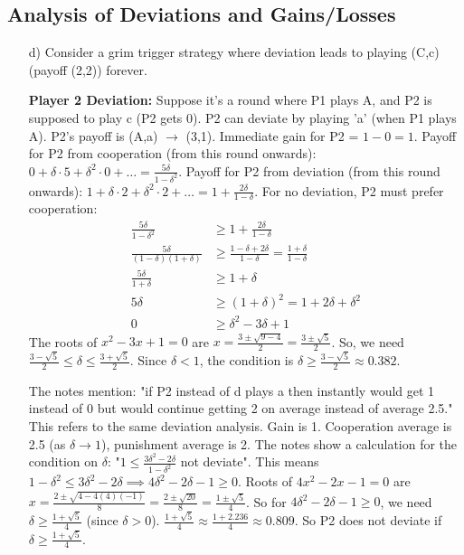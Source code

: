 \begin{solution}
\subsection*{Analysis of Deviations and Gains/Losses}
\begin{enumerate}
    \item[d)] Consider a grim trigger strategy where deviation leads to playing (C,c) (payoff (2,2)) forever.
    
    \textbf{Player 2 Deviation:}
    Suppose it's a round where P1 plays A, and P2 is supposed to play c (P2 gets 0).
    P2 can deviate by playing 'a' (when P1 plays A). P2's payoff is (A,a) $\rightarrow$ (3,1).
    Immediate gain for P2 = $1 - 0 = 1$.
    Payoff for P2 from cooperation (from this round onwards): $0 + \delta \cdot 5 + \delta^2 \cdot 0 + \dots = \frac{5\delta}{1-\delta^2}$.
    Payoff for P2 from deviation (from this round onwards): $1 + \delta \cdot 2 + \delta^2 \cdot 2 + \dots = 1 + \frac{2\delta}{1-\delta}$.
    For no deviation, P2 must prefer cooperation:
    \begin{align*} \frac{5\delta}{1-\delta^2} &\ge 1 + \frac{2\delta}{1-\delta} \\ \frac{5\delta}{(1-\delta)(1+\delta)} &\ge \frac{1-\delta+2\delta}{1-\delta} = \frac{1+\delta}{1-\delta} \\ \frac{5\delta}{1+\delta} &\ge 1+\delta \\ 5\delta &\ge (1+\delta)^2 = 1 + 2\delta + \delta^2 \\ 0 &\ge \delta^2 - 3\delta + 1 \end{align*}
    The roots of $x^2 - 3x + 1 = 0$ are $x = \frac{3 \pm \sqrt{9-4}}{2} = \frac{3 \pm \sqrt{5}}{2}$.
    So, we need $\frac{3-\sqrt{5}}{2} \le \delta \le \frac{3+\sqrt{5}}{2}$. Since $\delta < 1$, the condition is $\delta \ge \frac{3-\sqrt{5}}{2} \approx 0.382$.
    
    The notes mention: "if P2 instead of d plays a then instantly would get 1 instead of 0 but would continue getting 2 on average instead of average 2.5." This refers to the same deviation analysis. Gain is 1. Cooperation average is 2.5 (as $\delta \to 1$), punishment average is 2.
    The notes show a calculation for the condition on $\delta$: "$1 \le \frac{3\delta^2-2\delta}{1-\delta^2}$ not deviate".
    This means $1-\delta^2 \le 3\delta^2-2\delta \implies 4\delta^2-2\delta-1 \ge 0$.
    Roots of $4x^2-2x-1=0$ are $x = \frac{2 \pm \sqrt{4-4(4)(-1)}}{8} = \frac{2 \pm \sqrt{20}}{8} = \frac{1 \pm \sqrt{5}}{4}$.
    So for $4\delta^2-2\delta-1 \ge 0$, we need $\delta \ge \frac{1+\sqrt{5}}{4}$ (since $\delta>0$).
    $\frac{1+\sqrt{5}}{4} \approx \frac{1+2.236}{4} \approx 0.809$.
    So P2 does not deviate if $\delta \ge \frac{1+\sqrt{5}}{4}$.


\end{enumerate}
\end{solution}
